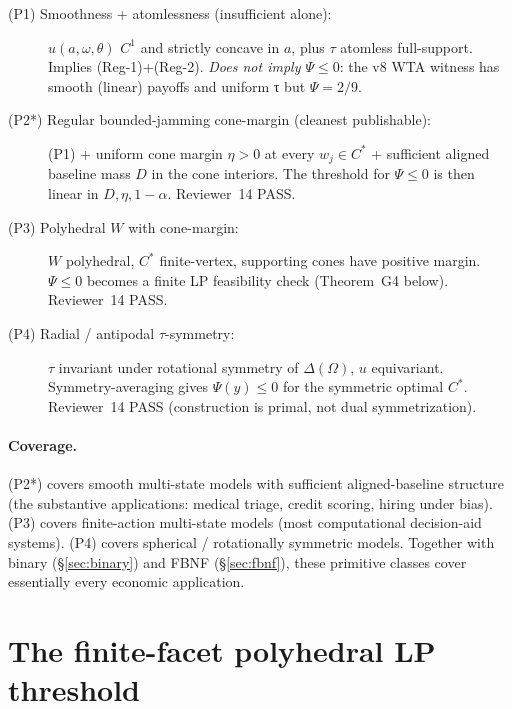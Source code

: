 \documentclass[11pt]{article}
\theoremstyle{definition}
\theoremstyle{remark}
\begin{document}
\begin{description}
  \item[(P1) Smoothness + atomlessness (insufficient alone):]
    $u(a, \omega, \theta)$ $C^1$ and strictly concave in $a$, plus
    $\tau$ atomless full-support. Implies (Reg-1)+(Reg-2). \emph{Does
    not imply $\Psi\le 0$}: the v8 WTA witness has smooth (linear)
    payoffs and uniform τ but $\Psi = 2/9$.
  \item[(P2*) Regular bounded-jamming cone-margin (cleanest publishable):]
    (P1) + uniform cone margin $\eta > 0$ at every $w_j\in C^*$ +
    sufficient aligned baseline mass $D$ in the cone interiors. The
    threshold for $\Psi\le 0$ is then linear in $D, \eta, 1-\alpha$.
    Reviewer~14 PASS.
  \item[(P3) Polyhedral $W$ with cone-margin:] $W$ polyhedral, $C^*$
    finite-vertex, supporting cones have positive margin. $\Psi\le 0$
    becomes a finite LP feasibility check (Theorem~G4 below).
    Reviewer~14 PASS.
  \item[(P4) Radial / antipodal $\tau$-symmetry:] $\tau$ invariant
    under rotational symmetry of $\Delta(\Omega)$, $u$ equivariant.
    Symmetry-averaging gives $\Psi(y)\le 0$ for the symmetric optimal
    $C^*$. Reviewer~14 PASS (construction is primal, not dual
    symmetrization).
\end{description}

\paragraph{Coverage.} (P2*) covers smooth multi-state models with
sufficient aligned-baseline structure (the substantive applications:
medical triage, credit scoring, hiring under bias). (P3) covers
finite-action multi-state models (most computational decision-aid
systems). (P4) covers spherical / rotationally symmetric models.
Together with binary (\S\ref{sec:binary}) and FBNF (\S\ref{sec:fbnf}),
these primitive classes cover essentially every economic application.

\section{The finite-facet polyhedral LP threshold}\label{sec:G4}
\end{document}
